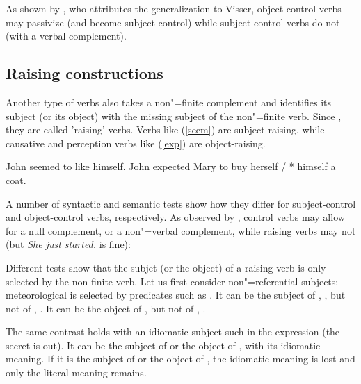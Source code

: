 \documentclass[output=paper
                ,modfonts
                ,nonflat
	        ,collection
	        ,collectionchapter
	        ,collectiontoclongg
 	        ,biblatex
                ,babelshorthands
                ,newtxmath
                ,draftmode
                ,colorlinks, citecolor=brown
]{./langsci/langscibook}
\begin{document}
As shown by \citet{Bresnan1982}, who attributes the generalization to Visser, object-control verbs may passivize (and become subject-control) while   subject-control verbs do not (with a verbal complement).
\eal
{}
\zl
 
\subsection{Raising constructions}

Another type of verbs also takes a non"=finite complement and identifies its subject (or its object) with the missing subject of the non"=finite verb. Since \citet{Postal1974}, they are called 'raising' verbs. Verbs like  (\ref{seem}) are subject-raising, while
causative and perception verbs like  (\ref{exp}) are object-raising.
\begin{exe}
	\ex \begin{xlist}
	\ex John seemed to like himself.\label{seem}
\ex  John expected Mary to buy herself / * himself a coat. \label{exp}
\end{xlist}
 \end{exe}
 
 A number of syntactic and semantic tests show how they differ for subject-control and object-control verbs, respectively. As observed by \citet{Jacobson1990}, control verbs may allow for a null complement, or a non"=verbal complement, while raising verbs may not (but \emph{She just started.} is fine):

\eal
{}
\zl
 
 Different tests show that the subjet (or the object) of a raising verb is only selected by the non
 finite verb. Let us first consider non"=referential subjects: meteorological  is selected
 by predicates such as . It can be the subject of , , but not of
 , . It can be the object of ,  but not of , .
	
\eal
{}
\zl
\eal
{}
\zl
 	
 The same contrast holds with an idiomatic subject such  in the expression  (the secret is out). It can be the subject of  or the object of , with its idiomatic meaning. If it is the subject of  or the object of , the idiomatic meaning is lost and only the literal meaning remains.
 
\end{document}
